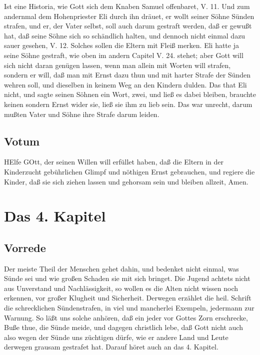 Ist eine Historia, wie Gott sich dem Knaben Samuel offenbaret, V. 11. Und zum andernmal dem Hohenpriester Eli durch ihn dräuet, er wollt seiner Söhne Sünden strafen, und er, der Vater selbst, soll auch darum gestraft werden, daß er gewußt hat, daß seine Söhne sich so schändlich halten, und dennoch nicht einmal dazu sauer gesehen, V. 12. Solches sollen die Eltern mit Fleiß merken. Eli hatte ja seine Söhne gestraft, wie oben im andern Capitel V. 24. stehet; aber Gott will sich nicht daran genügen lassen, wenn man allein mit Worten will strafen, sondern er will, daß man mit Ernst dazu thun und mit harter Strafe der Sünden wehren soll, und dieselben in keinem Weg an den Kindern dulden. Das that Eli nicht, und sagte seinen Söhnen ein Wort, zwei, und ließ es dabei bleiben, brauchte keinen sondern Ernst wider sie, ließ sie ihm zu lieb sein. Das war unrecht, darum mußten Vater und Söhne ihre Strafe darum leiden.

\section{Votum}

HElfe GOtt, der seinen Willen will erfüllet haben, daß die Eltern in der Kinderzucht gebührlichen Glimpf und nöthigen Ernst gebrauchen, und regiere die Kinder, daß sie sich ziehen lassen und gehorsam sein und bleiben allzeit, Amen.

\chapter{Das 4. Kapitel}

\section{Vorrede}

Der meiste Theil der Menschen gehet dahin, und bedenket nicht einmal, was Sünde sei und wie großen Schaden sie mit sich bringet. Die Jugend achtets nicht aus Unverstand und Nachlässigkeit, so wollen es die Alten nicht wissen noch erkennen, vor großer Klugheit und Sicherheit. Derwegen erzählet die heil. Schrift die schrecklichen Sündenstrafen, in viel und mancherlei Exempeln, jedermann zur Warnung. So läßt uns solche anhören, daß ein jeder vor Gottes Zorn erschrecke, Buße thue, die Sünde meide, und dagegen christlich lebe, daß Gott nicht auch also wegen der Sünde uns züchtigen dürfe, wie er andere Land und Leute derwegen grausam gestrafet hat. Darauf höret auch an das 4. Kapitel.

